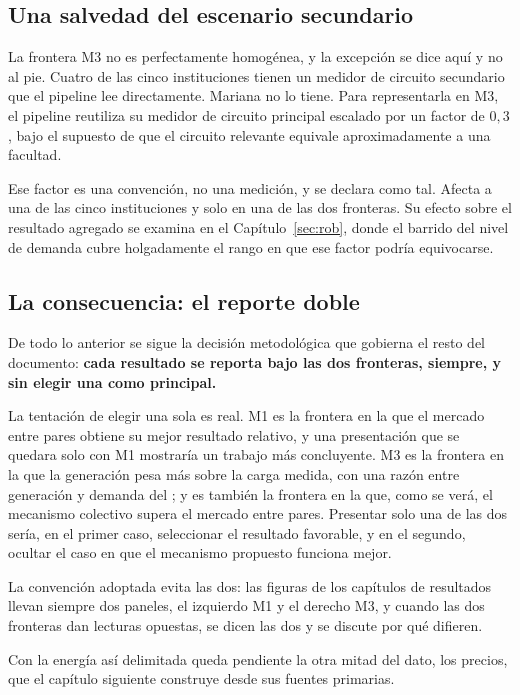 \subsection{Una salvedad del escenario secundario}
\label{sub:frontera-mariana}

La frontera M3 no es perfectamente homogénea, y la excepción se dice aquí
y no al pie. Cuatro de las cinco instituciones tienen un
medidor de circuito secundario que el pipeline lee directamente. Mariana
no lo tiene. Para representarla en M3, el pipeline
reutiliza su medidor de circuito principal escalado por un factor de $0{,}3$, bajo
el supuesto de que el circuito relevante equivale aproximadamente a una
facultad.

Ese factor es una convención, no una medición, y se declara como tal.
Afecta a una de las cinco instituciones y solo en una de las dos
fronteras. Su efecto sobre el resultado agregado se examina en el
Capítulo~\ref{sec:rob}, donde el barrido del nivel de demanda cubre
holgadamente el rango en que ese factor podría equivocarse.

\subsection{La consecuencia: el reporte doble}
\label{sub:frontera-consecuencia}

De todo lo anterior se sigue la decisión metodológica que gobierna el
resto del documento: \textbf{cada resultado se reporta bajo las dos
fronteras, siempre, y sin elegir una como principal.}

La tentación de elegir una sola es real. M1 es la frontera en
la que el mercado entre pares obtiene su mejor resultado relativo, y una
presentación que se quedara solo con M1 mostraría un trabajo más
concluyente. M3 es la frontera en la que la generación pesa más sobre
la carga medida, con una razón entre generación y demanda del
; y es también la frontera en la que, como se verá, el
mecanismo colectivo supera el mercado entre pares. Presentar solo una
de las dos sería, en el primer caso, seleccionar el resultado favorable, y
en el segundo, ocultar el caso en que el mecanismo propuesto funciona
mejor.

La convención adoptada evita las dos: las figuras de los capítulos de
resultados llevan siempre dos paneles, el izquierdo M1 y el derecho M3, y
cuando las dos fronteras dan lecturas opuestas, se dicen las dos y se
discute por qué difieren.

Con la energía así delimitada queda pendiente la otra mitad del dato, los
precios, que el capítulo siguiente construye desde sus fuentes primarias.
